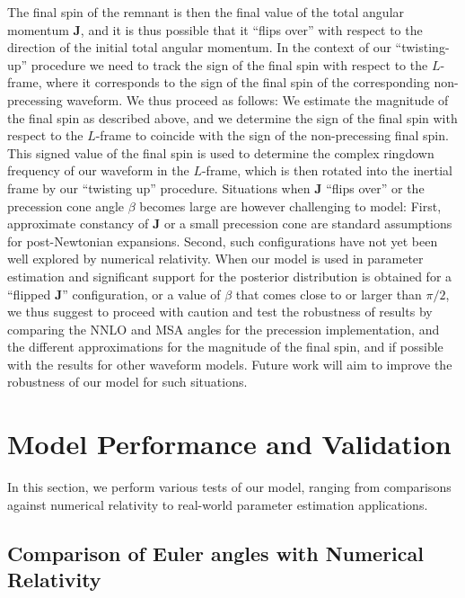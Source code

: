 \documentclass[%
aps,
prd,
amssymb,
amsmath,
amsfonts,
eqsecnum,
showpacs,
nofootinbib,
floatfix,
twocolumn,
twoside,
a4paper,
superscriptaddress
]{revtex4-1}
\begin{document}
The final spin of the remnant is then the final value of the total angular momentum ${\mathbf J}$, and it is thus possible that it ``flips over'' with respect to the direction of the initial total angular momentum.  In the context of our ``twisting-up'' procedure we need to track the sign of the final spin with respect to the $L$-frame, where it corresponds to the sign of the final spin of the corresponding non-precessing waveform. We thus proceed as follows: We estimate the magnitude of the final spin as described above, and we determine the sign of the final spin with respect to the $L$-frame to coincide with the sign of the non-precessing final spin. This signed value of the final spin is used to determine the complex ringdown frequency
of our waveform in the $L$-frame, which is then rotated into the inertial frame by our ``twisting up'' procedure.
Situations when ${\mathbf J}$ ``flips over'' or the precession cone angle $\beta$ becomes large are however 
challenging to model: First, approximate constancy of ${\mathbf J}$ or a small precession cone are standard assumptions for post-Newtonian expansions. Second, such configurations have not yet been well explored by numerical relativity. When our model is used in parameter estimation and significant support for the posterior distribution is obtained for a ``flipped ${\mathbf J}$'' configuration, or a value of $\beta$ that comes close to or larger than $\pi/2$, we thus suggest to proceed with caution and test the robustness of results by comparing the NNLO and MSA angles for the precession implementation, and the different approximations for the magnitude of the final spin, and if possible with the results for other waveform models. Future work will aim to improve the robustness of our model for such situations.



\section{Model Performance and Validation}
\label{sec:validation}

In this section, we perform various tests of our model,
ranging from comparisons against numerical relativity to real-world parameter estimation applications.


\subsection{Comparison of Euler angles with Numerical Relativity}
\label{sec:compare_eulerangles_with_NR}
\end{document}
